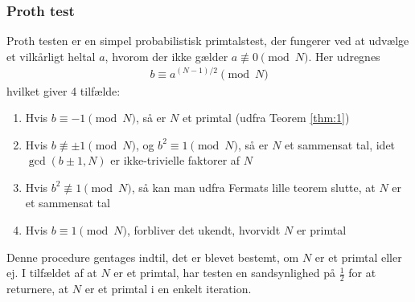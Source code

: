 \subsubsection{Proth test}
Proth testen er en simpel probabilistisk primtalstest, der fungerer ved at udvælge et vilkårligt heltal $a$,
hvorom der ikke gælder $a \not \equiv 0 \pmod{N}$. Her udregnes
\begin{align*}
  b \equiv a^{(N-1)/2} \pmod{N}
\end{align*}
hvilket giver 4 tilfælde:
\begin{enumerate}
  \item Hvis $b \equiv -1 \pmod{N}$, så er $N$ et primtal (udfra Teorem \ref{thm:1})
  \item Hvis $b \not \equiv \pm 1 \pmod{N}$, og $b^2 \equiv 1 \pmod{N}$, så er $N$ et sammensat tal, idet $\gcd(b \pm 1, N)$ er ikke-trivielle faktorer af $N$
  \item Hvis $b^2 \not \equiv 1 \pmod{N}$, så kan man udfra Fermats lille teorem slutte, at $N$ er et sammensat tal
  \item Hvis $b \equiv 1 \pmod{N}$, forbliver det ukendt, hvorvidt $N$ er primtal
\end{enumerate}
Denne procedure gentages indtil, det er blevet bestemt, om $N$ er et primtal eller ej. I tilfældet af at $N$ er et primtal,
har testen en sandsynlighed på $\frac{1}{2}$ for at returnere, at $N$ er et primtal i en enkelt iteration.
